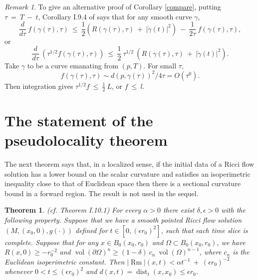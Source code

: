 \documentclass[12pt]{amsart}
\newcommand{\dist}{\operatorname{dist}}
\newcommand{\Rm}{\operatorname{Rm}}
\newcommand{\vol}{\operatorname{vol}}
\numberwithin{equation}{section}
\theoremstyle{plain}
\newtheorem{theorem}[equation]{Theorem}
\theoremstyle{definition}
\theoremstyle{remark}
\newtheorem{remark}[equation]{Remark}
\begin{document}
\begin{remark}
To give an alternative proof of Corollary \ref{compare}, putting $\tau \: = \: T \: - \: t$,
Corollary I.9.4 of \cite{Perelman} says that for any smooth curve $\gamma$,
\begin{equation}
\frac{d}{d\tau} \: f(\gamma(\tau), \tau) \: \le \:
\frac{1}{2} \left( R(\gamma(\tau), \tau) \: + \: \big| \dot{\gamma}(t)
\big|^2 \right) \: - \: \frac{1}{2\tau} \: f(\gamma(\tau), \tau),
\end{equation}
or 
\begin{equation}
\frac{d}{d\tau} \: \left( \tau^{1/2} f(\gamma(\tau), \tau) \right) \: \le \:
\frac{1}{2} \: \tau^{1/2} \:
\left( R(\gamma(\tau), \tau) \: + \: \big| \dot{\gamma}(t)
\big|^2 \right).
\end{equation}
Take $\gamma$ to be a curve emanating from
$(p, T)$.
For small $\tau$,
\begin{equation}
f(\gamma(\tau), \tau) \sim d(p, \gamma(\tau))^2/4\tau =
O(\tau^0).
\end{equation}
Then
integration gives $\tau^{1/2} f \: \le \: \frac12 \: L$, or $f \: \le \: l$.
\end{remark}

\section{The statement of the pseudolocality theorem}
\label{statement of I.10.1}

The next theorem says that, in a localized sense, if the initial
data of a Ricci flow solution
has a lower bound on the scalar curvature and satisfies
an isoperimetric inequality close to that of Euclidean space
then there is a sectional curvature bound in a forward region.
The result is not used in the sequel.

\begin{theorem} (cf. Theorem I.10.1) \label{thmI.10.1}
For every $\alpha > 0$ there exist $\delta,\epsilon > 0$ with the
following property.  Suppose that we have a 
smooth 
pointed Ricci flow solution
$(M, (x_0, 0), g(\cdot))$  
defined for $t \in [0, (\epsilon r_0)^2]$,
such that each time slice
is complete.
Suppose that
for any $x \in B_0(x_0, r_0)$ and $\Omega \subset B_0(x_0, r_0)$,
we have $R(x,0) \ge - r_0^{-2}$ and $\vol(\partial \Omega)^n
\ge (1-\delta) \: c_n \: \vol(\Omega)^{n-1}$, where $c_n$ is the
Euclidean isoperimetric constant.  Then 
$|\Rm|(x,t) <
\alpha t^{-1} \: + \: (\epsilon r_0)^{-2}$
 whenever
$0 < t \le (\epsilon r_0)^2$ and 
$d(x,t) = \dist_t(x, x_0) \le
\epsilon r_0$.
\end{theorem}
\end{document}
